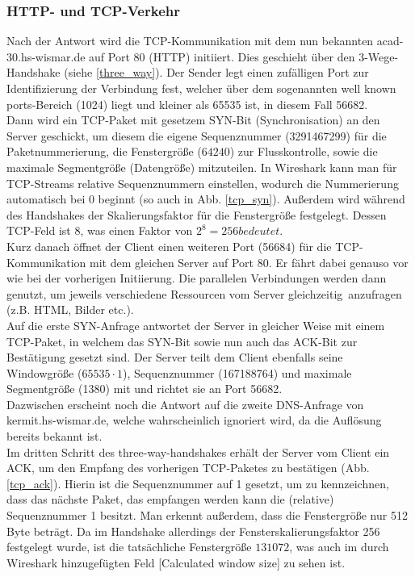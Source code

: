 \documentclass[11pt, a4paper]{article}
\begin{document}
\subsubsection{HTTP- und TCP-Verkehr}
Nach der Antwort wird die TCP-Kommunikation mit dem nun bekannten acad-30.hs-wismar.de auf Port 80 (HTTP) initiiert. Dies geschieht über den 3-Wege-Handshake (siehe \ref{three_way}). Der Sender legt einen zufälligen Port zur Identifizierung der Verbindung fest, welcher über dem sogenannten \glqq well known ports\grqq-Bereich (1024) liegt und kleiner als 65535 ist, in diesem Fall 56682.\\

Dann wird ein TCP-Paket mit gesetzem SYN-Bit (Synchronisation) an den Server geschickt, um diesem die eigene Sequenznummer (3291467299) für die Paketnummerierung, die Fenstergröße ($64240$) zur Flusskontrolle, sowie die maximale Segmentgröße (Datengröße) mitzuteilen. In Wireshark kann man für TCP-Streams relative Sequenznummern einstellen, wodurch die Nummerierung automatisch bei 0 beginnt (so auch in Abb. \ref{tcp_syn}). Außerdem wird während des Handshakes der Skalierungsfaktor für die Fenstergröße festgelegt. Dessen TCP-Feld ist 8, was einen Faktor von $2^{8} = 256 bedeutet$.\\

Kurz danach öffnet der Client einen weiteren Port (56684) für die TCP-Kommunikation mit dem gleichen Server auf Port 80. Er fährt dabei genauso vor wie bei der vorherigen Initiierung. Die parallelen Verbindungen werden dann genutzt, um jeweils verschiedene Ressourcen vom Server \glqq gleichzeitig\grqq\ anzufragen (z.B. HTML, Bilder etc.).\\

Auf die erste SYN-Anfrage antwortet der Server in gleicher Weise mit einem TCP-Paket, in welchem das SYN-Bit sowie nun auch das ACK-Bit zur Bestätigung gesetzt sind. Der Server teilt dem Client ebenfalls seine Windowgröße ($65535 \cdot 1$), Sequenznummer (167188764) und maximale Segmentgröße (1380) mit und richtet sie an Port 56682.\\

Dazwischen erscheint noch die Antwort auf die zweite DNS-Anfrage von kermit.hs-wismar.de, welche wahrscheinlich ignoriert wird, da die Auflösung bereits bekannt ist.\\

Im dritten Schritt des three-way-handshakes erhält der Server vom Client ein ACK, um den Empfang des vorherigen TCP-Paketes zu bestätigen (Abb. \ref{tcp_ack}). Hierin ist die Sequenznummer auf 1 gesetzt, um zu kennzeichnen, dass das nächste Paket, das empfangen werden kann die (relative) Sequenznummer 1 besitzt. Man erkennt außerdem, dass die Fenstergröße nur 512 Byte beträgt. Da im Handshake allerdings der Fensterskalierungsfaktor 256 festgelegt wurde, ist die tatsächliche Fenstergröße $131072$, was auch im durch Wireshark hinzugefügten Feld [Calculated window size] zu sehen ist.\\
\end{document}
